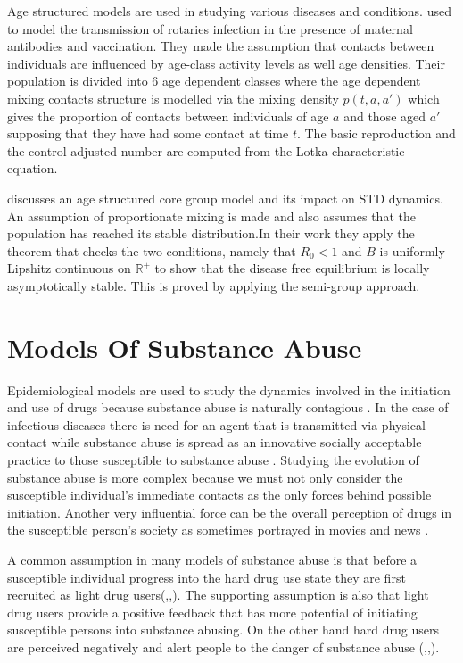 Age structured models are used in studying various diseases and conditions. \cite{shim2006age} used to model the transmission of rotaries infection in the presence of maternal antibodies and vaccination. They made the  assumption that contacts between individuals are influenced by age-class activity levels as well age densities. Their population is divided into 6 age dependent classes where the age dependent mixing contacts structure is modelled via the mixing density $p(t,a,a')$ which gives the proportion of contacts between individuals of age $a$ and those aged $a'$ supposing that they have had some contact at time $t$. The basic reproduction and the control adjusted number are computed from the Lotka characteristic equation.


\cite{castillo2002age} discusses an age structured core group model and its impact on STD dynamics. An assumption of proportionate mixing is made and also assumes that the population has reached its stable distribution.In their work they apply the theorem that checks the two conditions, namely that $R_0 <1$ and $B$ is uniformly Lipshitz continuous on $\mathbb{R}^+$ to show that the disease free equilibrium is locally asymptotically stable. This is proved by applying the semi-group approach.

\section{Models Of Substance Abuse}

Epidemiological models are used to study the dynamics involved in the initiation and use of drugs because substance abuse is naturally contagious \cite{agestructureddrug}. In the case of infectious diseases there is need for an agent that is transmitted via physical contact while substance abuse is spread as an innovative socially acceptable practice to those susceptible to substance  abuse \cite{kalula2012}. Studying the evolution of substance abuse is more complex because we must not only consider the susceptible individual's immediate contacts as the only forces behind possible initiation. Another very influential force can be the overall perception of drugs in the susceptible person's society as sometimes portrayed in movies and news \cite{agestructureddrug}.

A common assumption in many models of substance abuse is that before a susceptible individual progress into the hard drug use state they are first recruited as light drug users(\cite{agestructureddrug},\cite{kalula2012},\cite{nyabadza2010}). The supporting assumption is also that light drug users provide a positive feedback that has more potential of initiating susceptible persons into substance abusing. On the other hand hard drug users are perceived negatively and alert people to the danger of substance abuse (\cite{agestructureddrug},\cite{kalula2012},\cite{nyabadza2010}).

